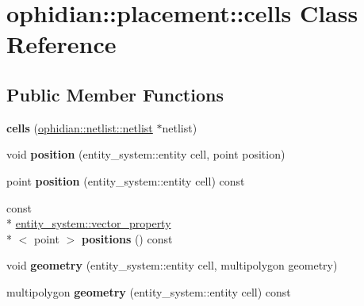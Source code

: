 \hypertarget{classophidian_1_1placement_1_1cells}{\section{ophidian\-:\-:placement\-:\-:cells Class Reference}
\label{classophidian_1_1placement_1_1cells}
}
\subsection*{Public Member Functions}
\begin{DoxyCompactItemize}
\item 
\hypertarget{classophidian_1_1placement_1_1cells_a73b759d7b27b7f984f00d75f951f6581}{{\bfseries cells} (\hyperlink{classophidian_1_1netlist_1_1netlist}{ophidian\-::netlist\-::netlist} $\ast$netlist)}\label{classophidian_1_1placement_1_1cells_a73b759d7b27b7f984f00d75f951f6581}

\item 
\hypertarget{classophidian_1_1placement_1_1cells_a8c71aee4ee0d62559eecf18721cbec45}{void {\bfseries position} (entity\-\_\-system\-::entity cell, point position)}\label{classophidian_1_1placement_1_1cells_a8c71aee4ee0d62559eecf18721cbec45}

\item 
\hypertarget{classophidian_1_1placement_1_1cells_a0b069db57211ada3180b926085fb31a1}{point {\bfseries position} (entity\-\_\-system\-::entity cell) const }\label{classophidian_1_1placement_1_1cells_a0b069db57211ada3180b926085fb31a1}

\item 
\hypertarget{classophidian_1_1placement_1_1cells_a6e0b71ad1c27f78beceaab0bdfb6eb9b}{const \\*
\hyperlink{classophidian_1_1entity__system_1_1vector__property}{entity\-\_\-system\-::vector\-\_\-property}\\*
$<$ point $>$ {\bfseries positions} () const }\label{classophidian_1_1placement_1_1cells_a6e0b71ad1c27f78beceaab0bdfb6eb9b}

\item 
\hypertarget{classophidian_1_1placement_1_1cells_a9577e64286fa8b5b30b04ba00f82bbeb}{void {\bfseries geometry} (entity\-\_\-system\-::entity cell, multipolygon geometry)}\label{classophidian_1_1placement_1_1cells_a9577e64286fa8b5b30b04ba00f82bbeb}

\item 
\hypertarget{classophidian_1_1placement_1_1cells_adca4cc113fc7e70bf6d8537ae109d6f8}{multipolygon {\bfseries geometry} (entity\-\_\-system\-::entity cell) const }\label{classophidian_1_1placement_1_1cells_adca4cc113fc7e70bf6d8537ae109d6f8}


\end{DoxyCompactItemize}

